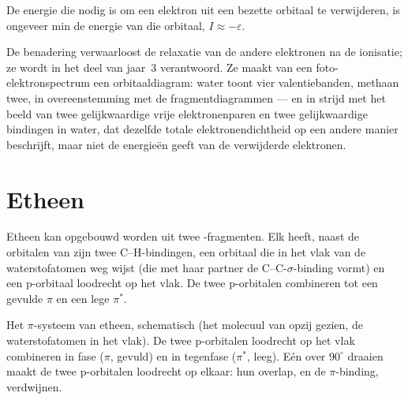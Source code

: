\begin{proposition}\label{prop:b2:fragment-orbitals:koopmans}
De energie die nodig is om een elektron uit een bezette orbitaal te verwijderen, is
ongeveer min de energie van die orbitaal, $I \approx -\varepsilon$.
\end{proposition}

\admitted

De benadering verwaarloost de relaxatie van de andere elektronen na de
ionisatie; ze wordt in het deel van jaar~3 verantwoord. Ze maakt van een foto-elektronspectrum
een orbitaaldiagram: water toont vier valentiebanden, methaan twee,
in overeenstemming met de fragmentdiagrammen --- en in strijd met het beeld van twee gelijkwaardige
vrije elektronenparen en twee gelijkwaardige bindingen in water, dat dezelfde totale
elektronendichtheid op een andere manier beschrijft, maar niet de energieën geeft van de
verwijderde elektronen.

\section{Etheen}

Etheen kan opgebouwd worden uit twee -fragmenten. Elk  heeft, naast de
orbitalen van zijn twee C--H-bindingen, een orbitaal die in het vlak van de waterstofatomen
weg wijst (die met haar partner de C--C-$\sigma$-binding vormt) en een p-orbitaal
loodrecht op het vlak. De twee p-orbitalen combineren tot een gevulde $\pi$ en een
lege $\pi^*$.

\begin{omfigure}

{\small Het $\pi$-systeem van etheen, schematisch (het molecuul van opzij gezien, de
waterstofatomen in het vlak). De twee p-orbitalen loodrecht op het vlak combineren
in fase ($\pi$, gevuld) en in tegenfase ($\pi^*$, leeg). Eén  over $90^\circ$
draaien maakt de twee p-orbitalen loodrecht op elkaar: hun overlap, en de $\pi$-binding,
verdwijnen.}
\end{omfigure}

